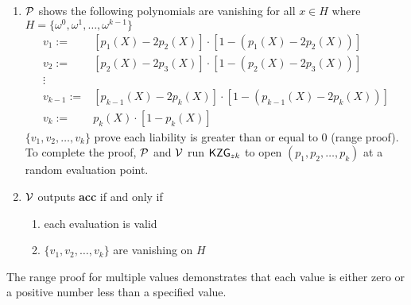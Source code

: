 \begin{Protocol*}[t!]
\begin{mdframed}
\begin{enumerate}
    \item $\mathcal{P}$ shows the following polynomials are vanishing for all $x\in{H}$ where $H=\{\omega^0,\omega^1,\dots,\omega^{k-1}\}$
    \begin{align*}
        v_1:=&[p_1(X)-2p_2(X)]\cdot[1-(p_1(X)-2p_2(X))] \\
        v_2:=&[p_2(X)-2p_3(X)]\cdot[1-(p_2(X)-2p_3(X))] \\
        \vdots \\
        v_{k-1}:=&[p_{k-1}(X)-2p_k(X)]\cdot[1-(p_{k-1}(X)-2p_k(X))] \\
        v_k:=&p_k(X)\cdot[1-p_k(X)]
    \end{align*}
    $\{v_1,v_2,\dots,v_k\}$ prove each liability is greater than or equal to 0 (range proof). To complete the proof, $\mathcal{P}$ and $\mathcal{V}$ run $\mathsf{KZG}_{zk}$ to open $(p_1,p_2,\dots,p_k)$ at a random evaluation point.
    \item $\mathcal{V}$ outputs \textbf{acc} if and only if
    \begin{enumerate}
        \item each evaluation is valid
        \item $\{v_1,v_2,\dots,v_k\}$ are vanishing on $H$
    \end{enumerate}
\end{enumerate}


\normalsize	
\end{mdframed}
\caption{The range proof for multiple values demonstrates that each value is either zero or a positive number less than a specified value. \label{alg:multirange}}
\end{Protocol*}
